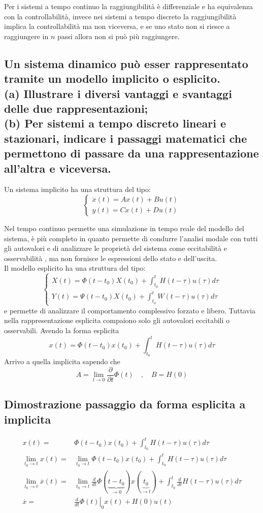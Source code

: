 \documentclass{article}
\begin{document}
Per i sistemi a tempo continuo la raggiungibilità è differenziale e ha equivalenza con la controllabilità,
invece nei sistemi a tempo discreto la raggiungibilità implica la controllabilità ma non viceversa,
e se uno stato non si riesce a raggiungere in $n$ passi allora non si può più raggiungere.


\subsection{Un sistema dinamico può esser rappresentato tramite un modello implicito o esplicito. \\
(a) Illustrare i diversi vantaggi e svantaggi delle due rappresentazioni; \\
(b) Per sistemi a tempo discreto lineari e stazionari, indicare i passaggi matematici che permettono
di passare da una rappresentazione all'altra e viceversa.
}
Un sistema implicito ha una struttura del tipo:
$$
\begin{cases}
    \dot{x}(t) = Ax(t)+Bu(t)\\
    y(t) = Cx(t)+Du(t)
\end{cases}
$$

Nel tempo continuo permette una simulazione in tempo reale del modello del sistema, è più completo in quanto permette di condurre l'analisi modale con tutti gli autovalori e di analizzare le proprietà del sistema come eccitabilità e osservabilità , ma non fornisce le espressioni dello stato e dell'uscita.\\
Il modello esplicito ha una struttura del tipo:
\[
\begin{cases}
    X(t) = \Phi(t-t_0)X(t_0)+\int_{t_0}^{t}H(t-\tau)u(\tau)d\tau\\
    Y(t) = \Psi(t-t_0)X(t_0)+\int_{t_0}^{t}W(t-\tau)u(\tau)d\tau
\end{cases}
\]
e permette di analizzare il comportamento complessivo forzato e libero.
Tuttavia nella rappresentazione esplicita compaiono solo gli autovalori eccitabili o osservabili.
Avendo la forma esplicita 
\[     x(t) = \Phi(t-t_0)x(t_0)+\int_{t_0}^{t} H(t-\tau)u(\tau)d\tau \]
Arrivo a quella implicita sapendo che 
\[ A = \lim_{t\to 0}\frac{\partial }{\partial t}\Phi(t) \quad,\quad B = H(0) \]


\subsection{Dimostrazione passaggio da forma esplicita a implicita}

\begin{align*}
    x(t)  = & \Phi(t-t_0)x(t_0)+\int_{t_0}^{t}H(t-\tau)u(\tau)d\tau \\
    \lim_{t_0\to t}x(t)  = & \lim_{t_0\to t} \Phi(t-t_0)x(t_0)+\int_{t_0}^{t}H(t-\tau)u(\tau)d\tau \\
    \lim_{t_0\to t}\overset{\cdot}{x}(t)  = &\lim_{t_0\to t} \frac{d}{dt}\Phi(\underbrace{t-t_0}_{\to 0})x(\underbrace{t_0}_{\to t})
        +\int_{t_0}^{t}\frac{d}{dt}H(t-\tau)u(\tau)d\tau\\
        \overset{\cdot}{x}  = & \left.\frac{d}{dt}\Phi(t)\right|_{0}x(t)+H(0)u(t)
\end{align*}
\end{document}

